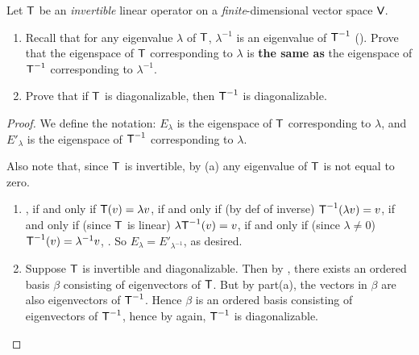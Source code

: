\begin{exercise} \label{exercise 5.2.13}
Let \(\textsf{T}\) be an \emph{invertible} linear operator on a \emph{finite}-dimensional vector space \(\textsf{V}\).
\begin{enumerate}
\item Recall that for any eigenvalue \(\lambda\) of \(\textsf{T}\), \(\lambda^{-1}\) is an eigenvalue of \(\textsf{T}^{-1}\) ().
Prove that the eigenspace of \(\textsf{T}\) corresponding to \(\lambda\) is \textbf{the same as} the eigenspace of \(\textsf{T}^{-1}\) corresponding to \(\lambda^{-1}\).
\item Prove that if \(\textsf{T}\) is diagonalizable, then \(\textsf{T}^{-1}\) is diagonalizable.
\end{enumerate}
\end{exercise}

\begin{proof}
We define the notation: \(E_{\lambda}\) is the eigenspace of \(\textsf{T}\) corresponding to \(\lambda\), and \(E'_{\lambda}\) is the eigenspace of \(\textsf{T}^{-1}\) corresponding to \(\lambda\).

Also note that, since \(\textsf{T}\) is invertible, by (a) any eigenvalue of \(\textsf{T}\) is not equal to zero.

\begin{enumerate}
\item {}, if and only if \(\textsf{T}(v) = \lambda v\), if and only if (by def of inverse) \(\textsf{T}^{-1} (\lambda v) = v\), if and only if (since \(\textsf{T}\) is linear) \(\lambda \textsf{T}^{-1}(v) = v\), if and only if (since \(\lambda \ne 0\)) \(\textsf{T}^{-1}(v) = \lambda^{-1} v\), .
So \(E_{\lambda} = E'_{\lambda^{-1}}\), as desired.

\item Suppose \(\textsf{T}\) is invertible and diagonalizable.
Then by , there exists an ordered basis \(\beta\) consisting of eigenvectors of \(\textsf{T}\).
But by part(a), the vectors in \(\beta\) are also eigenvectors of \(\textsf{T}^{-1}\).
Hence \(\beta\) is an ordered basis consisting of eigenvectors of \(\textsf{T}^{-1}\), hence by  again, \(\textsf{T}^{-1}\) is diagonalizable.
\end{enumerate}
\end{proof}

